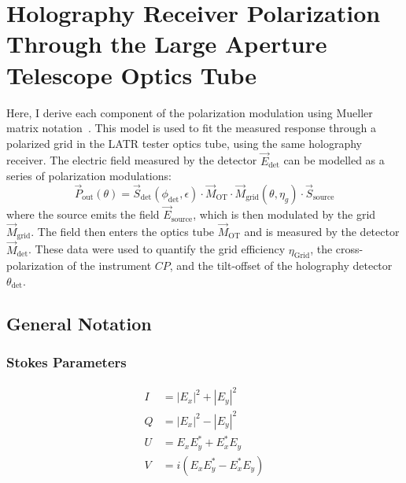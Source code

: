
\chapter{Holography Receiver Polarization Through the Large Aperture Telescope Optics Tube} %
\label{app:pol} %

Here, I derive each component of the polarization modulation using Mueller matrix notation~\cite{MUELLER}.  This model is used to fit the measured response through a polarized grid in the LATR tester optics tube, using the same holography receiver.  The electric field measured by the detector $\vec{E}_{\text{det}}$ can be modelled as a series of polarization modulations: 
\begin{equation}
    \vec{P}_{\text{out}}(\theta) = \vec{S}_{\text{det}}(\phi_{\text{det}},\epsilon)\cdot \vec{M}_{\text{OT}}\cdot \vec{M}_{\text{grid}}(\theta,\eta_{g})\cdot \vec{S}_{\text{source}}
    \label{eq:holo_model}
\end{equation}
where the source emits the field $\vec{E}_{\text{source}}$, which is then modulated by the grid $\vec{M}_{\text{grid}}$.  The field then enters the optics tube $\vec{M}_{\text{OT}}$ and is measured by the detector $\vec{M}_{\text{det}}$.  These data were used to quantify the grid efficiency $\eta_{\text{Grid}}$, the cross-polarization of the instrument $CP$, and the tilt-offset of the holography detector $\theta_{\text{det}}$.

\section{General Notation}
\subsection{Stokes Parameters}
\begin{equation}
\begin{split}
    I & = |E_x|^2 + |E_y|^2 \\
    Q & = |E_x|^2 - |E_y|^2 \\
    U & = E_x E_y^* + E_x^*E_y\\
    V & = i(E_x E_y^* - E_x^*E_y) \\
\end{split}
\end{equation}

